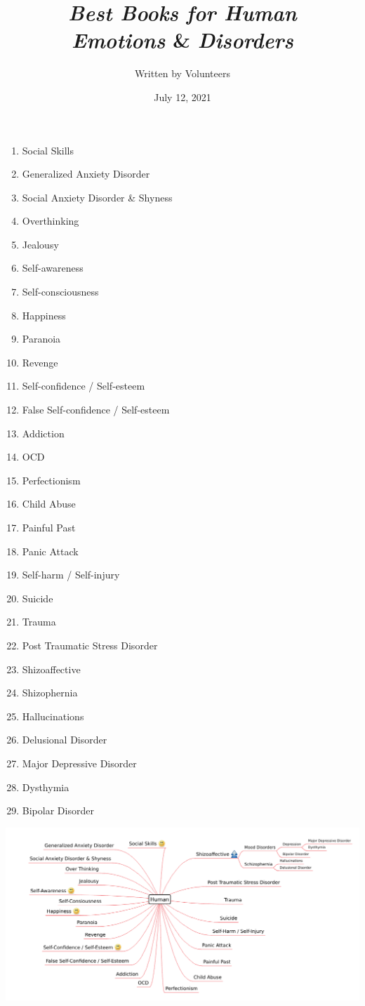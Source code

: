 \documentclass[12pt, a4paper]{article}
\title{\emph{Best Books for Human\\Emotions} \& \emph{Disorders}}
\author{Written by Volunteers}
\date{July 12, 2021}
\begin{document}
\maketitle
\begin{enumerate}

\item Social Skills
\item Generalized Anxiety Disorder
\item Social Anxiety Disorder \& Shyness
\item Overthinking
\item Jealousy
\item Self-awareness
\item Self-consciousness
\item Happiness
\item Paranoia
\item Revenge
\item Self-confidence / Self-esteem
\item False Self-confidence / Self-esteem
\item Addiction
\item OCD
\item Perfectionism
\item Child Abuse
\item Painful Past
\item Panic Attack
\item Self-harm / Self-injury
\item Suicide
\item Trauma
\item Post Traumatic Stress Disorder
\item Shizoaffective
\item Shizophernia
\item Hallucinations
\item Delusional Disorder
\item Major Depressive Disorder
\item Dysthymia
\item Bipolar Disorder

\end{enumerate}

\begin{center}
	\includegraphics[scale=0.43]{human.png}
\end{center}
\end{document}
